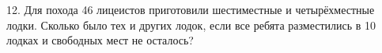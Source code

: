 12. Для похода 46 лицеистов приготовили шестиместные и четырёхместные лодки. Сколько было тех и других лодок, если все ребята разместились в 10 лодках и свободных мест не осталось?\\

